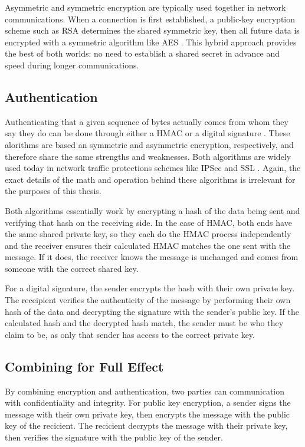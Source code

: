 \par Asymmetric and symmetric encryption are typically used together in network communications. When a connection is first established, a public-key encryption scheme such as \ac{RSA} determines the shared symmetric key, then all future data is encrypted with a symmetric algorithm like \ac{AES} \cite{HybridEncryption}. This hybrid approach provides the best of both worlds: no need to establish a shared secret in advance and speed during longer communications.

\subsection{Authentication}
\label{sec:authentication}
\par Authenticating that a given sequence of bytes actually comes from whom they say they do can be done through either a \ac{HMAC} \cite{rfc2104} or a digital signature \cite{rfc3447}. These alorithms are based an symmetric and asymmetric encryption, respectively, and therefore share the same strengths and weaknesses. Both algorithms are widely used today in network traffic protections schemes like \ac{IPSec} and \ac{SSL} . Again, the exact details of the math and operation behind these algorithms is irrelevant for the purposes of this thesis. 

\par Both algorithms essentially work by encrypting a hash of the data being sent and verifying that hash on the receiving side. In the case of \ac{HMAC}, both ends have the same shared private key, so they each do the \ac{HMAC} process independently and the receiver ensures their calculated HMAC matches the one sent with the message. If it does, the receiver knows the message is unchanged and comes from someone with the correct shared key.

\par For a digital signature, the sender encrypts the hash with their own private key. The receipient verifies the authenticity of the message by performing their own hash of the data and decrypting the signature with the sender's public key. If the calculated hash and the decrypted hash match, the sender must be who they claim to be, as only that sender has access to the correct private key.

\subsection{Combining for Full Effect}
\label{sec:auth_and_encrypt}
\par By combining encryption and authentication, two parties can communication with confidentiality and integrity. For public key encryption, a sender signs the message with their own private key, then encrypts the message with the public key of the recicient. The recicient decrypts the message with their private key, then verifies the signature with the public key of the sender.

